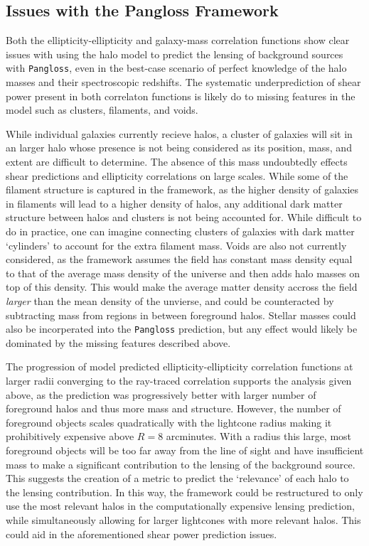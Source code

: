 \documentclass[%
 reprint,
 amsmath,amssymb,
 aps,nofootinbib
]{revtex4-1}
\begin{document}
\subsection*{Issues with the Pangloss Framework}

Both the ellipticity-ellipticity and galaxy-mass correlation functions show clear issues with using the halo model to predict the lensing of background sources with \texttt{Pangloss}, even in the best-case scenario of perfect knowledge of the halo masses and their spectroscopic redshifts. The systematic underprediction of shear power present in both correlaton functions is likely do to missing features in the model such as clusters, filaments, and voids. 

While individual galaxies currently recieve halos, a cluster of galaxies will sit in an larger halo whose presence is not being considered as its position, mass, and extent are difficult to determine. The absence of this mass undoubtedly effects shear predictions and ellipticity correlations on large scales. While some of the filament structure is captured in the framework, as the higher density of galaxies in filaments will lead to a higher density of halos, any additional dark matter structure between halos and clusters is not being accounted for. While difficult to do in practice, one can imagine connecting clusters of galaxies with dark matter `cylinders' to account for the extra filament mass. Voids are also not currently considered, as the framework assumes the field has constant mass density equal to that of the average mass density of the universe and then adds halo masses on top of this density. This would make the average matter density accross the field \textit{larger} than the mean density of the unvierse, and could be counteracted by subtracting mass from regions in between foreground halos. Stellar masses could also be incorperated into the \texttt{Pangloss} prediction, but any effect would likely be dominated by the missing features described above.

The progression of model predicted ellipticity-ellipticity correlation functions at larger radii converging to the ray-traced correlation supports the analysis given above, as the prediction was progressively better with larger number of foreground halos and thus more mass and structure. However, the number of foreground objects scales quadratically with the lightcone radius making it prohibitively expensive above $R=8$ arcminutes. With a radius this large, most foreground objects will be too far away from the line of sight and have insufficient mass to make a significant contribution to the lensing of the background source. This suggests the creation of a metric to predict the `relevance' of each halo to the lensing contribution. In this way, the framework could be restructured to only use the most relevant halos in the computationally expensive lensing prediction, while simultaneously allowing for larger lightcones with more relevant halos. This could aid in the aforementioned shear power prediction issues.  
\end{document}
